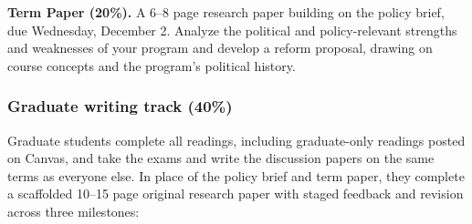 \documentclass[12pt]{article}
\begin{document}
\vspace{0.5em}
\noindent \textbf{Term Paper (20\%).} A 6--8 page research paper building on the policy brief, due Wednesday, December 2. Analyze the political and policy-relevant strengths and weaknesses of your program and develop a reform proposal, drawing on course concepts and the program's political history.

\subsubsection*{Graduate writing track (40\%)}

Graduate students complete all readings, including graduate-only readings posted on Canvas, and take the exams and write the discussion papers on the same terms as everyone else. In place of the policy brief and term paper, they complete a scaffolded 10--15 page original research paper with staged feedback and revision across three milestones:
\end{document}
